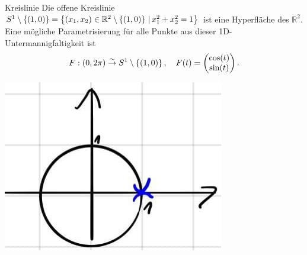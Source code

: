 \begin{Beispiel}
{Kreislinie}
Die offene Kreislinie $S^1\setminus\left\{(1,0)\right\}=\left\{(x_1,x_2)\in\mathbb{R}^2\setminus\left\{(1,0)\right\}\,|\, x^2_1+x_2^2=1\right\}$ ist eine Hyperfläche des $\mathbb{R}^2$.\\
Eine mögliche Parametrisierung für alle Punkte aus dieser 1D-Untermannigfaltigkeit ist
\begin{equation*}
    F:(0,2\pi)\overset{\sim}{\to}S^1\setminus\left\{(1,0)\right\}, \quad F(t)=\begin{pmatrix}\cos(t)\\\sin(t)\end{pmatrix}.
\end{equation*}
\begin{center}
    \includegraphics[width=.15\textwidth]{Dateien/10/10Kreislinie.jpg}
\end{center}
\end{Beispiel}

